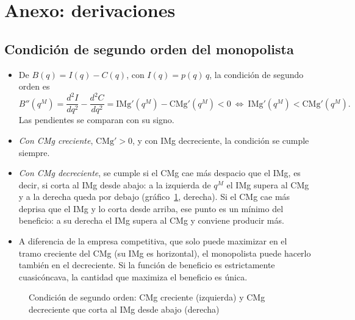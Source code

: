 \documentclass[11pt]{article}
\begin{document}
\clearpage
\appendix

\section{Anexo: derivaciones}\label{anexo:derivaciones}

\subsection{Condición de segundo orden del monopolista}\label{anexo:cso}

\begin{itemize}
\item De $B(q)=I(q)-C(q)$, con $I(q)=p(q)\,q$, la condición de segundo orden es
  \begin{equation}
  B''(q^M)=\frac{d^2I}{dq^2}-\frac{d^2C}{dq^2}=\mathrm{IMg}'(q^M)-\mathrm{CMg}'(q^M)<0\ \Longleftrightarrow\ \mathrm{IMg}'(q^M)<\mathrm{CMg}'(q^M).
  \end{equation}
  Las pendientes se comparan con su signo.
\item \emph{Con CMg creciente}, $\mathrm{CMg}'>0$, y con IMg decreciente, la condición se cumple siempre.
\item \emph{Con CMg decreciente}, se cumple si el CMg cae más despacio que el IMg, es decir, si corta al IMg desde abajo: a la izquierda de $q^M$ el IMg supera al CMg y a la derecha queda por debajo (gráfico~\ref{fig:cso-monopolio}, derecha). Si el CMg cae más deprisa que el IMg y lo corta desde arriba, ese punto es un mínimo del beneficio: a su derecha el IMg supera al CMg y conviene producir más.
\item A diferencia de la empresa competitiva, que solo puede maximizar en el tramo creciente del CMg (su IMg es horizontal), el monopolista puede hacerlo también en el decreciente. Si la función de beneficio es estrictamente cuasicóncava, la cantidad que maximiza el beneficio es única.\findemo
\end{itemize}

\begin{figure}[H]
\centering
\caption{Condición de segundo orden: CMg creciente (izquierda) y CMg decreciente que corta al IMg desde abajo (derecha)}\label{fig:cso-monopolio}
\end{figure}
\end{document}
